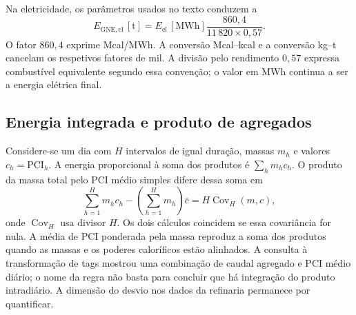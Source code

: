 Na eletricidade, os parâmetros usados no texto conduzem a
\begin{equation}
E_{\mathrm{GNE,el}}\,[\mathrm{t}]
=E_{\mathrm{el}}\,[\mathrm{MWh}]
\frac{860{,}4}{11\,820\times0{,}57}.
\label{eq:mat-gne-eletricidade}
\end{equation}
O fator $860{,}4$ exprime Mcal/MWh. A conversão Mcal--kcal e a conversão kg--t cancelam os respetivos fatores de mil. A divisão pelo rendimento $0{,}57$ expressa combustível equivalente segundo essa convenção; o valor em MWh continua a ser a energia elétrica final.


\subsection{Energia integrada e produto de agregados}
\label{sec:mat-produto-medias}
Considere-se um dia com $H$ intervalos de igual duração, massas $m_h$ e valores $c_h=\mathrm{PCI}_h$. A energia proporcional à soma dos produtos é $\sum_hm_hc_h$. O produto da massa total pelo PCI médio simples difere dessa soma em
\begin{equation}
\sum_{h=1}^H m_hc_h-\left(\sum_{h=1}^Hm_h\right)\bar c
=H\operatorname{Cov}_H(m,c),
\label{eq:mat-covariancia-agregacao}
\end{equation}
onde $\operatorname{Cov}_H$ usa divisor $H$. Os dois cálculos coincidem se essa covariância for nula. A média de PCI ponderada pela massa reproduz a soma dos produtos quando as massas e os poderes caloríficos estão alinhados. A consulta à transformação de tags mostrou uma combinação de caudal agregado e PCI médio diário; o nome da regra não basta para concluir que há integração do produto intradiário. A dimensão do desvio nos dados da refinaria permanece por quantificar.


